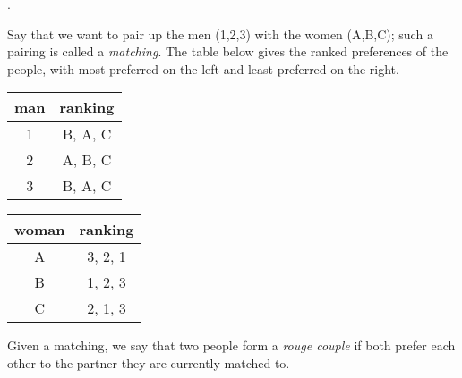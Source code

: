 \documentclass[11pt, preview]{standalone} %
\begin{document}
.

Say that we want to pair up the men (1,2,3) with the women (A,B,C); such a pairing is called a \emph{matching}. The table below gives the ranked preferences of the people, with most preferred on the left and least preferred on the right.

\begin{center}
\begin{tabular}{|c|c|}
\hline
man & ranking \\
\hline
1 & B, A, C \\
\hline
2 & A, B, C \\
\hline
3 & B, A, C \\
\hline
\end{tabular}
\qquad
\begin{tabular}{|c|c|}
\hline
woman & ranking \\
\hline
A & 3, 2, 1\\
\hline
B & 1, 2, 3 \\
\hline
C & 2, 1, 3\\
\hline
\end{tabular}
\end{center}
Given a matching, we say that two people form a \emph{rouge couple} if both prefer each other to the partner they are currently matched to. 
\end{document}
